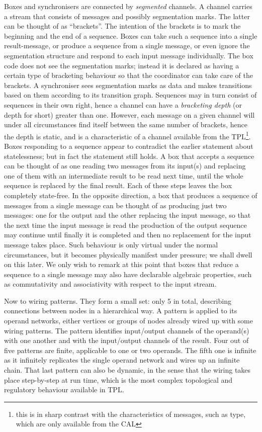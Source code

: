 \documentclass[11pt]{report}
\begin{document}
Boxes and synchronisers are connected by {\em segmented} channels. A channel carries a stream that consists of messages and
possibly segmentation marks. The latter can be thought of as ``brackets''. The intention of the brackets is to mark the beginning
and the end of a sequence. Boxes can take such a sequence into a single result-message, or produce a sequence from a single message,
or even ignore the segmentation structure and respond to each input message individually. The box code does not see the segmentation marks;
instead it is declared as having a certain type of bracketing behaviour so that the coordinator can take care of the brackets.
A synchroniser sees segmentation marks as data and makes transitions based on them according to its transition graph. Sequences
may in turn consist of sequences in their own right, hence a channel can have a {\em bracketing depth} (or  depth for short) greater than one.
However, each message on a given channel will under all circumstances find itself between the same number of brackets, hence
the depth is static, and is a characteristic of a channel available from the TPL\footnote{this is in sharp contrast with the characteristics of messages,
such as type, which are only available from the CAL}. Boxes responding to a sequence appear to contradict the earlier statement about
statelessness; but in fact the statement still holds. A box that accepts a sequence can be thought of as one reading two messages from
its input(s) and replacing one of them with an intermediate result to be read next time, until the whole sequence is replaced by the final result.
Each of these steps leaves the box completely state-free. In the opposite direction, a box that produces a sequence of messages from
a single message can be thought of as producing just two messages: one for the output and the other replacing the input message,
so that the next time the input message is read the production of the output sequence may continue until finally it is completed and
then no replacement for the input message takes place. Such behaviour is only virtual under the normal circumstances, but it becomes
physically manifest under pressure; we shall dwell on this later. We only wish to remark at this point that boxes that reduce a sequence
to a single message may also have declarable algebraic properties, such as commutativity and associativity with respect to the input stream.

Now to wiring patterns. They form a small set: only 5 in total,  describing connections between nodes in a hierarchical way. A pattern
is applied to its operand networks, either vertices or groups of nodes already wired up with some wiring patterns. The pattern identifies
input/output channels of the operand(s) with one another and with the input/output channels of the result. Four out of five patterns are finite,
applicable to one or two operands. The fifth one is infinite as it infinitely replicates the single operand network
and wires up an infinite chain. That last pattern can also be dynamic, in the sense that the wiring takes place step-by-step at run time, which is the most complex topological and regulatory behaviour available in TPL.
\end{document}
